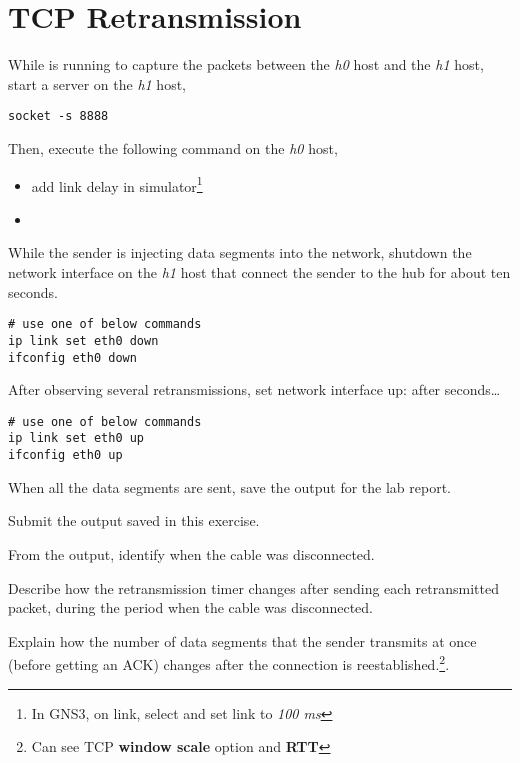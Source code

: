 \documentclass{../UTNetLab}
\begin{document}
\section{TCP Retransmission}
    While  is running to capture the packets between the \textit{h0} host and the \textit{h1} host, start a  server on the \textit{h1} host,
    \begin{lstlisting}
socket -s 8888
    \end{lstlisting}
    Then, execute the following command on the \textit{h0} host,
    \begin{itemize}
        \item add link delay in simulator\footnote{In GNS3,  on link, select  and set link  to \textit{100 ms}}
        \item {}
    \end{itemize}
    While the sender is injecting data segments into the network, shutdown the network interface on the \textit{h1} host that connect the sender to the hub for about ten seconds.
    \begin{lstlisting}[emph={eth0}]
# use one of below commands
ip link set eth0 down
ifconfig eth0 down
    \end{lstlisting}

    After observing several retransmissions, set network interface up:
after seconds\ldots
    \begin{lstlisting}[emph={eth0}]
# use one of below commands
ip link set eth0 up
ifconfig eth0 up
    \end{lstlisting} %
    When all the data segments are sent, save the  output for the lab report.
    
    \begin{report}
        \item Submit the  output saved in this exercise.
        
        \item From the  output, identify when the cable was disconnected.
        
        \item Describe how the retransmission timer changes after sending each retransmitted packet, during the period when the cable was disconnected.
        
        \item Explain how the number of data segments that the sender transmits at once (before getting an ACK) changes after the connection is reestablished.\footnote{Can see TCP \textbf{window scale} option and \textbf{RTT}}.
    \end{report}
    
\end{document}
